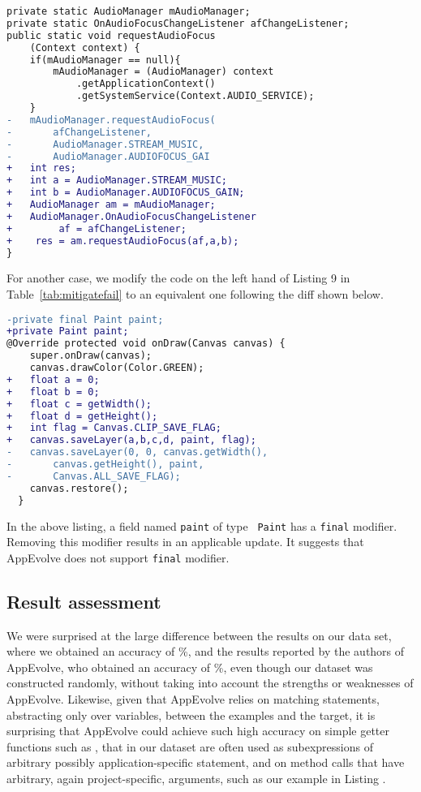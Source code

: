 \vspace{0.5cm}\begin{lstlisting}[language=diff,numbers=none]
private static AudioManager mAudioManager;
private static OnAudioFocusChangeListener afChangeListener;
public static void requestAudioFocus
    (Context context) {
    if(mAudioManager == null){
        mAudioManager = (AudioManager) context
            .getApplicationContext()
            .getSystemService(Context.AUDIO_SERVICE);
    }
-   mAudioManager.requestAudioFocus(
-       afChangeListener,
-       AudioManager.STREAM_MUSIC,
-       AudioManager.AUDIOFOCUS_GAI
+   int res;
+   int a = AudioManager.STREAM_MUSIC;
+   int b = AudioManager.AUDIOFOCUS_GAIN;
+   AudioManager am = mAudioManager;
+   AudioManager.OnAudioFocusChangeListener
+        af = afChangeListener;
+    res = am.requestAudioFocus(af,a,b);
}
\end{lstlisting}


\vspace{0.5cm} For another case, we modify the code on the left hand of Listing 9 in Table~\ref{tab:mitigatefail} to an equivalent one following the diff shown below.

\vspace{0.5cm}\begin{lstlisting}[language=diff,numbers=none]
-private final Paint paint;
+private Paint paint;
@Override protected void onDraw(Canvas canvas) {
    super.onDraw(canvas);
    canvas.drawColor(Color.GREEN);
+   float a = 0;
+   float b = 0;
+   float c = getWidth();
+   float d = getHeight();
+   int flag = Canvas.CLIP_SAVE_FLAG;
+   canvas.saveLayer(a,b,c,d, paint, flag);
-   canvas.saveLayer(0, 0, canvas.getWidth(),
-       canvas.getHeight(), paint,
-       Canvas.ALL_SAVE_FLAG);
    canvas.restore();
  }
\end{lstlisting}

\vspace{0.5cm}In the above listing, a field named {\tt paint} of type {\tt
  Paint} has a {\tt final} modifier. Removing this modifier results in an
applicable update. It suggests that AppEvolve does not support {\tt final}
modifier.

\subsection{Result assessment}

We were surprised at the large difference between the results on our data
set, where we obtained an accuracy  of \%, and the
results reported by the authors of AppEvolve, who obtained an accuracy of
\%, even though our dataset was constructed randomly, without
taking into account the strengths or weaknesses of AppEvolve.  Likewise,
given that AppEvolve relies on matching statements, abstracting only over
variables, between the examples and the target, it is surprising that
AppEvolve could achieve such high accuracy on simple getter functions such
as , that in our dataset are often used as
subexpressions of arbitrary possibly application-specific statement, and on
method calls that have arbitrary, again project-specific, arguments, such
as our example in Listing .


